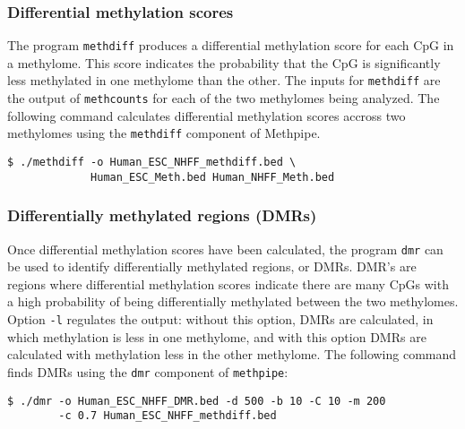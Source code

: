 \documentclass[10pt]{article}
\newcommand{\meth}{\texttt{methpipe}}
\newcommand{\prog}[1]{\texttt{#1}}
\newcommand{\op}[1]{\texttt{#1}}
\begin{document}
\subsubsection{Differential methylation scores}
\label{sec:methdiff}

The program \prog{methdiff} produces a differential methylation score
for each CpG in a methylome. This score indicates the probability that
the CpG is significantly less methylated in one methylome than the
other. The inputs for \prog{methdiff} are the output of
\prog{methcounts} for each of the two methylomes being analyzed. The
following command calculates differential methylation scores accross
two methylomes using the \prog{methdiff} component of Methpipe.
\begin{verbatim}
$ ./methdiff -o Human_ESC_NHFF_methdiff.bed \
             Human_ESC_Meth.bed Human_NHFF_Meth.bed
\end{verbatim}





\subsubsection{Differentially methylated regions (DMRs)}
\label{sec:dmr}

Once differential methylation scores have been calculated, the program
\prog{dmr} can be used to identify differentially methylated
regions, or DMRs. DMR's are regions where differential methylation
scores indicate there are many CpGs with a high probability of being
differentially methylated between the two methylomes.  Option
\op{-l} regulates the output: without this option, DMRs are
calculated, in which methylation is less in one methylome, and with
this option DMRs are calculated with methylation less in the other
methylome. The following command finds DMRs using the \prog{dmr}
component of \meth{}:
\begin{verbatim}
$ ./dmr -o Human_ESC_NHFF_DMR.bed -d 500 -b 10 -C 10 -m 200
        -c 0.7 Human_ESC_NHFF_methdiff.bed
\end{verbatim}
\end{document}
